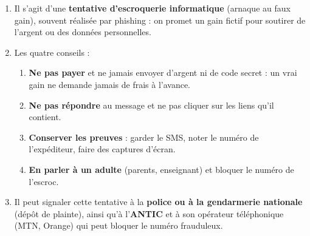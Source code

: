 \documentclass[11pt]{article}
\begin{document}
\begin{corrige}
\begin{enumerate}
\item Il s'agit d'une \textbf{tentative d'escroquerie informatique} (arnaque au faux gain), souvent réalisée par phishing : on promet un gain fictif pour soutirer de l'argent ou des données personnelles.
\item Les quatre conseils :
\begin{enumerate}
\item \textbf{Ne pas payer} et ne jamais envoyer d'argent ni de code secret : un vrai gain ne demande jamais de frais à l'avance.
\item \textbf{Ne pas répondre} au message et ne pas cliquer sur les liens qu'il contient.
\item \textbf{Conserver les preuves} : garder le SMS, noter le numéro de l'expéditeur, faire des captures d'écran.
\item \textbf{En parler à un adulte} (parents, enseignant) et bloquer le numéro de l'escroc.
\end{enumerate}
\item Il peut signaler cette tentative à la \textbf{police ou à la gendarmerie nationale} (dépôt de plainte), ainsi qu'à l'\textbf{ANTIC} et à son opérateur téléphonique (MTN, Orange) qui peut bloquer le numéro frauduleux.
\end{enumerate}
\end{corrige}
\end{document}
